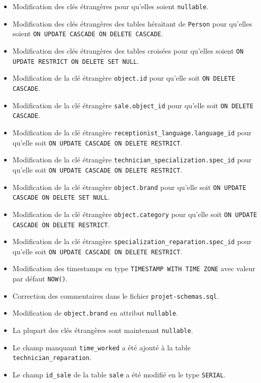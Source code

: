 \documentclass{article}
\newcommand{\ttt}{\texttt}
\begin{document}
\begin{itemize}
    \item Modification des clés étrangères pour qu'elles soient \ttt{nullable}.
    \item Modification des clés étrangères des tables héraitant de \ttt{Person} pour qu'elles soient \ttt{ON UPDATE CASCADE ON DELETE CASCADE}.
    \item Modification des clés étrangères des tables croisées pour qu'elles soient \ttt{ON UPDATE RESTRICT ON DELETE SET NULL}.
    \item Modification de la clé étrangère \ttt{object.id} pour qu'elle soit \ttt{ON DELETE CASCADE}.
    \item Modification de la clé étrangère \ttt{sale.object\_id} pour qu'elle soit \ttt{ON DELETE CASCADE}.
    \item Modification de la clé étrangère \ttt{receptionist\_language.language\_id} pour qu'elle soit \ttt{ON UPDATE CASCADE ON DELETE RESTRICT}.
    \item Modification de la clé étrangère \ttt{technician\_specialization.spec\_id} pour qu'elle soit \ttt{ON UPDATE CASCADE ON DELETE RESTRICT}.  
    \item Modification de la clé étrangère \ttt{object.brand} pour qu'elle soit \ttt{ON UPDATE CASCADE ON DELETE SET NULL}.
    \item Modification de la clé étrangère \ttt{object.category} pour qu'elle soit \ttt{ON UPDATE CASCADE ON DELETE RESTRICT}.
    \item Modification de la clé étrangère \ttt{specialization\_reparation.spec\_id} pour qu'elle soit \ttt{ON UPDATE CASCADE ON DELETE RESTRICT}.
    \item Modification des timestamps en type \ttt{TIMESTAMP WITH TIME ZONE} avec valeur par défaut \ttt{NOW()}.
    \item Correction des commentaires dans le fichier \ttt{projet-schemas.sql}.
    \item Modification de \ttt{object.brand} en attribut \ttt{nullable}.
    \item La plupart des clés étrangères sont maintenant \ttt{nullable}.
    \item Le champ manquant \ttt{time\_worked} a été ajouté à la table \ttt{technician\_reparation}.
    \item Le champ \ttt{id\_sale} de la table \ttt{sale} a été modifié en le type \ttt{SERIAL}.
\end{itemize}
\end{document}
